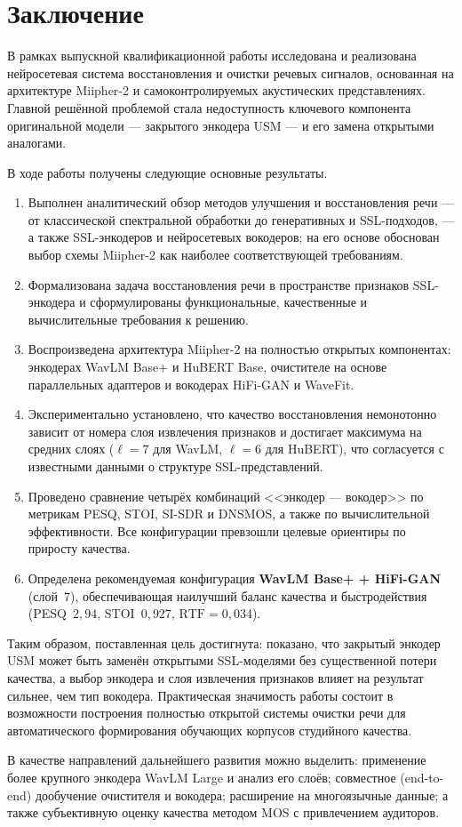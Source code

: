 \section{Заключение}
\label{sec:Chapter5} 

В рамках выпускной квалификационной работы исследована и реализована
нейросетевая система восстановления и очистки речевых сигналов, основанная на
архитектуре Miipher-2 и самоконтролируемых акустических представлениях. Главной
решённой проблемой стала недоступность ключевого компонента оригинальной модели
--- закрытого энкодера USM --- и его замена открытыми аналогами.

В ходе работы получены следующие основные результаты.
\begin{enumerate}
    \item Выполнен аналитический обзор методов улучшения и восстановления речи
        --- от классической спектральной обработки до генеративных и
        SSL-подходов, --- а также SSL-энкодеров и нейросетевых вокодеров; на его
        основе обоснован выбор схемы Miipher-2 как наиболее соответствующей
        требованиям.
    \item Формализована задача восстановления речи в пространстве признаков
        SSL-энкодера и сформулированы функциональные, качественные и
        вычислительные требования к решению.
    \item Воспроизведена архитектура Miipher-2 на полностью открытых
        компонентах: энкодерах WavLM Base+ и HuBERT Base, очистителе на основе
        параллельных адаптеров и вокодерах HiFi-GAN и WaveFit.
    \item Экспериментально установлено, что качество восстановления немонотонно
        зависит от номера слоя извлечения признаков и достигает максимума на
        средних слоях ($\ell=7$ для WavLM, $\ell=6$ для HuBERT), что согласуется
        с известными данными о структуре SSL-представлений.
    \item Проведено сравнение четырёх комбинаций <<энкодер — вокодер>> по
        метрикам PESQ, STOI, SI-SDR и DNSMOS, а также по вычислительной
        эффективности. Все конфигурации превзошли целевые ориентиры по приросту
        качества.
    \item Определена рекомендуемая конфигурация \textbf{WavLM Base+ + HiFi-GAN}
        (слой~7), обеспечивающая наилучший баланс качества и быстродействия
        (PESQ~$2{,}94$, STOI~$0{,}927$, $\mathrm{RTF}=0{,}034$).
\end{enumerate}

Таким образом, поставленная цель достигнута: показано, что закрытый энкодер USM
может быть заменён открытыми SSL-моделями без существенной потери качества, а
выбор энкодера и слоя извлечения признаков влияет на результат сильнее, чем тип
вокодера. Практическая значимость работы состоит в возможности построения
полностью открытой системы очистки речи для автоматического формирования
обучающих корпусов студийного качества.

В качестве направлений дальнейшего развития можно выделить: применение более
крупного энкодера WavLM Large и анализ его слоёв; совместное (end-to-end)
дообучение очистителя и вокодера; расширение на многоязычные данные; а также
субъективную оценку качества методом MOS с привлечением аудиторов.
